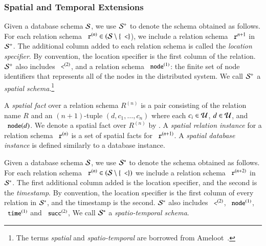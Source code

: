 

\subsubsection{Spatial and Temporal Extensions}
\label{sec:st}

Given a database schema $\schema$, we use $\sschema$ to denote the schema obtained
as follows. For each relation schema $\dedalus{r}^{(n)} \in (\schema \setminus \{\dedalus{<}\}$), we include a relation schema $\dedalus{r}^{n+1}$ in $\sschema$. The
additional column added to each relation schema is called the {\em location specifier}. By convention, the
location specifier is the first column of the relation.
$\sschema$ also includes $\dedalus{<}^{(2)}$, and a relation schema $\dedalus{node}^{(1)}$: the finite set of node identifiers that represents all of the nodes in the distributed system.
We call $\sschema$ a {\em spatial schema}.\footnote{The terms {\em spatial} and
  {\em spatio-temporal} are borrowed from Ameloot~\cite{ameloot-personal}.}

A {\em spatial fact} over a relation schema $R^{(n)}$ is a pair consisting of the relation name $R$ and an $(n+1)$-tuple $(d,c_1,\ldots,c_n)$ where each $c_i \in \univ$, $d \in \univ$, and $\dedalus{node}(d)$.  We denote a spatial fact over $R^{(n)}$ by .
A {\em spatial relation instance} for a relation schema $\dedalus{r}^{(n)}$ is a set of spatial facts for $\dedalus{r}^{(n+1)}$.
A {\em spatial database instance} is defined similarly to a database instance.

Given a database schema $\schema$, we use $\stschema$ to denote the schema obtained 
as follows. For each relation schema $\dedalus{r}^{(n)} \in (\schema \setminus \{\dedalus{<}\})$ we include a relation schema $\dedalus{r}^{(n+2)}$ in $\stschema$.  The first additional column added is the location specifier, and the second is the {\em timestamp}.  By convention, the location specifier is the first column of every relation in $\stschema$, and the timestamp is the second.  $\stschema$ also includes $\dedalus{<}^{(2)}$, $\dedalus{node}^{(1)}$, $\dedalus{time}^{(1)}$ and $\dedalus{succ}^{(2)}$,   We call $\stschema$ a {\em spatio-temporal schema}.

